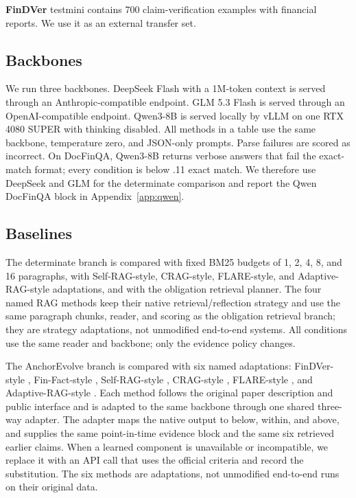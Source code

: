 \documentclass[11pt]{article}
\begin{document}
\textbf{FinDVer} \citep{zhao2024findver} testmini contains 700 claim-verification examples with financial reports. We use it as an external transfer set.

\subsection{Backbones}
We run three backbones. DeepSeek Flash with a 1M-token context is served through an Anthropic-compatible endpoint. GLM 5.3 Flash is served through an OpenAI-compatible endpoint. Qwen3-8B is served locally by vLLM on one RTX 4080 SUPER with thinking disabled. All methods in a table use the same backbone, temperature zero, and JSON-only prompts. Parse failures are scored as incorrect. On DocFinQA, Qwen3-8B returns verbose answers that fail the exact-match format; every condition is below .11 exact match. We therefore use DeepSeek and GLM for the determinate comparison and report the Qwen DocFinQA block in Appendix~\ref{app:qwen}.

\subsection{Baselines}
The determinate branch is compared with fixed BM25 budgets of 1, 2, 4, 8, and 16 paragraphs, with Self-RAG-style, CRAG-style, FLARE-style, and Adaptive-RAG-style adaptations, and with the obligation retrieval planner. The four named RAG methods keep their native retrieval/reflection strategy and use the same paragraph chunks, reader, and scoring as the obligation retrieval branch; they are strategy adaptations, not unmodified end-to-end systems. All conditions use the same reader and backbone; only the evidence policy changes.

The AnchorEvolve branch is compared with six named adaptations: FinDVer-style \citep{zhao2024findver}, Fin-Fact-style \citep{rangapur2025finfact}, Self-RAG-style \citep{asai2024selfrag}, CRAG-style \citep{yan2024crag}, FLARE-style \citep{jiang2023flare}, and Adaptive-RAG-style \citep{jeong2024adaptiverag}. Each method follows the original paper description and public interface and is adapted to the same backbone through one shared three-way adapter. The adapter maps the native output to below, within, and above, and supplies the same point-in-time evidence block and the same six retrieved earlier claims. When a learned component is unavailable or incompatible, we replace it with an API call that uses the official criteria and record the substitution. The six methods are adaptations, not unmodified end-to-end runs on their original data.
\end{document}
